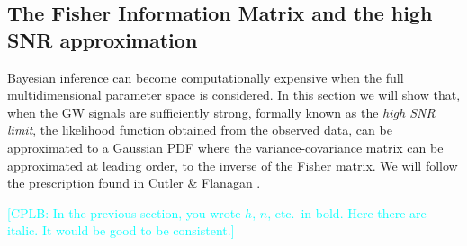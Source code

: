 \documentclass[a4paper,12pt]{article}
\newcommand{\cplb}[1]{\textcolor{cyan}{[CPLB: #1]}}
\begin{document}
\subsection{The Fisher Information Matrix and the high SNR approximation}
\label{subsec:Fisherapprox}

Bayesian inference can become computationally expensive when the full multidimensional parameter space is considered. In this section we will show that, when the GW signals are sufficiently strong, formally known as the \textit{high SNR limit}, the likelihood function obtained from the observed data, can be approximated to a Gaussian PDF where the variance-covariance matrix can be approximated at leading order, to the inverse of the Fisher matrix. We will follow the prescription found in Cutler $\&$ Flanagan \cite{cutler1994gravitational}.

\cplb{In the previous section, you wrote $h$, $n$, etc.\ in bold. Here there are italic. It would be good to be consistent.}
\end{document}
